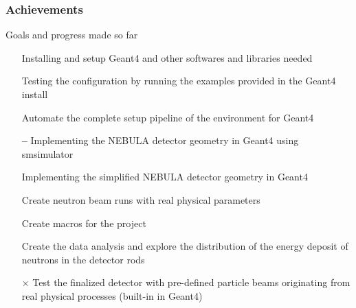\begin{frame}
\frametitle{Achievements}

\begin{block}{Goals and progress made so far}
	\begin{itemize}
		\item[{\color{PineGreen} \checkmark}] Installing and setup Geant4 and other softwares and libraries needed
		\item[{\color{PineGreen} \checkmark}] Testing the configuration by running the examples provided in the Geant4 install
		\item[{\color{PineGreen} \checkmark}] Automate the complete setup pipeline of the environment for Geant4
		\item[{\color{red} \textbf{--}}] Implementing the NEBULA detector geometry in Geant4 using smsimulator
		\item[{\color{PineGreen} \checkmark}] Implementing the simplified NEBULA detector geometry in Geant4
		\item[{\color{PineGreen} \checkmark}] Create neutron beam runs with real physical parameters
		\item[{\color{PineGreen} \checkmark}] Create macros for the project
		\item[{\color{PineGreen} \checkmark}] Create the data analysis and explore the distribution of the energy deposit of neutrons in the detector rods
		\item[{\color{red} $\boldsymbol{\times}$}] Test the finalized detector with pre-defined particle beams originating from real physical processes (built-in in Geant4)
	\end{itemize}
\end{block}

\end{frame}